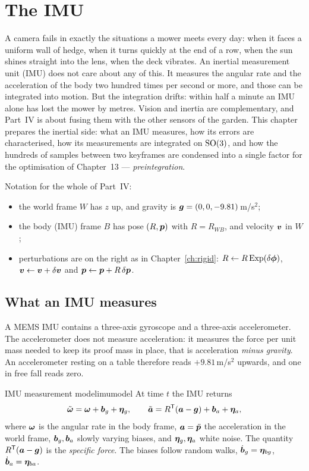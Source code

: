 \chapter{The IMU}
\label{ch:imu}

A camera fails in exactly the situations a mower meets every day: when
it faces a uniform wall of hedge, when it turns quickly at the end of a
row, when the sun shines straight into the lens, when the deck vibrates.
An inertial measurement unit (IMU) does not care about any of this. It
measures the angular rate and the acceleration of the body two hundred
times per second or more, and those can be integrated into motion. But
the integration drifts: within half a minute an IMU alone has lost the
mower by metres. Vision and inertia are complementary, and Part~IV is
about fusing them with the other sensors of the garden. This chapter
prepares the inertial side: what an IMU measures, how its errors are
characterised, how its measurements are integrated on $\mathrm{SO}(3)$, and how the
hundreds of samples between two keyframes are condensed into a single
factor for the optimisation of Chapter~13 --- \emph{preintegration}.

Notation for the whole of Part~IV:
\begin{itemize}[nosep]
\item the world frame $W$ has $z$ up, and gravity is
  $\bm{g}=(0,0,-9.81)$\,m/s$^2$;
\item the body (IMU) frame $B$ has pose $(R,\bm{p})$ with $R=R_{WB}$, and
  velocity $\bm{v}$ in $W$;
\item perturbations are on the right as in Chapter~\ref{ch:rigid}:
  $R\leftarrow R\operatorname{Exp}(\delta\bm{\phi})$,
  $\bm{v}\leftarrow\bm{v}+\delta\bm{v}$ and
  $\bm{p}\leftarrow\bm{p}+R\,\delta\bm{p}$.
\end{itemize}

\section{What an IMU measures}

A MEMS IMU contains a three-axis gyroscope and a three-axis
accelerometer. The accelerometer does not measure acceleration: it
measures the force per unit mass needed to keep its proof mass in
place, that is acceleration \emph{minus gravity}. An accelerometer
resting on a table therefore reads $+9.81$\,m/s$^2$ upwards, and one in
free fall reads zero.

\begin{definition}{IMU measurement model}{imumodel}
At time $t$ the IMU returns
\begin{equation}\label{eq:imumodel}
\tilde{\bm{\omega}}=\bm{\omega}+\bm{b}_g+\bm{\eta}_g,\qquad
\tilde{\bm{a}}=R^{\mathsf{T}}(\bm{a}-\bm{g})+\bm{b}_a+\bm{\eta}_a,
\end{equation}
where $\bm{\omega}$ is the angular rate in the body frame, $\bm{a}=\ddot{\bm{p}}$
the acceleration in the world frame, $\bm{b}_g,\bm{b}_a$ slowly
varying biases, and $\bm{\eta}_g,\bm{\eta}_a$ white noise. The
quantity $R^{\mathsf{T}}(\bm{a}-\bm{g})$ is the \emph{specific force}. The
biases follow random walks, $\dot{\bm{b}}_g=\bm{\eta}_{bg}$,
$\dot{\bm{b}}_a=\bm{\eta}_{ba}$.
\end{definition}

